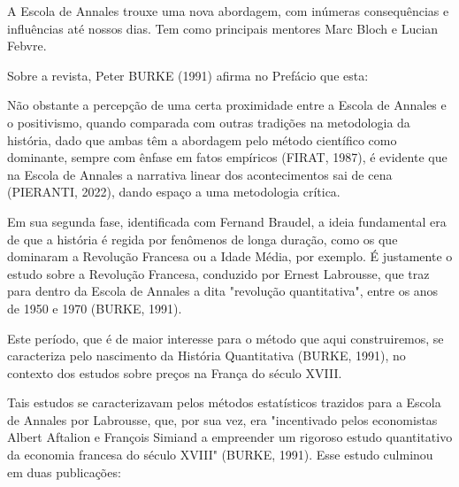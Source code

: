 A Escola de Annales trouxe uma nova abordagem, com inúmeras consequências e influências até nossos dias. Tem como principais mentores  Marc Bloch e Lucian Febvre.

Sobre a revista, Peter BURKE (1991) afirma no Prefácio que esta:


\noindent\begin{center}\mbox{\centering{}}\end{center}


Não obstante a percepção de uma certa proximidade entre a Escola de Annales e o positivismo, quando comparada com outras tradições na metodologia da história, dado que ambas têm a abordagem pelo método científico como dominante, sempre com ênfase em fatos empíricos (FIRAT, 1987), é evidente que na Escola de Annales a narrativa linear dos acontecimentos sai de cena (PIERANTI, 2022), dando espaço a uma metodologia crítica.

Em sua segunda fase, identificada com Fernand Braudel, a ideia fundamental era de que a história é regida por fenômenos de longa duração, como os que dominaram a Revolução Francesa ou a Idade Média, por exemplo. É justamente o estudo sobre a Revolução Francesa, conduzido por Ernest Labrousse, que traz para dentro da Escola de Annales a dita "revolução quantitativa", entre os anos de 1950 e 1970  (BURKE, 1991).

Este período, que é de maior interesse para o método que aqui construiremos, se caracteriza pelo nascimento da História Quantitativa (BURKE, 1991), no contexto dos estudos sobre preços na França do século XVIII.

Tais estudos se caracterizavam pelos métodos estatísticos trazidos para a Escola de Annales por Labrousse, que, por sua vez, era "incentivado pelos economistas Albert Aftalion e François Simiand a empreender um rigoroso estudo quantitativo da economia francesa do século XVIII"  (BURKE, 1991). Esse estudo culminou em duas publicações:



